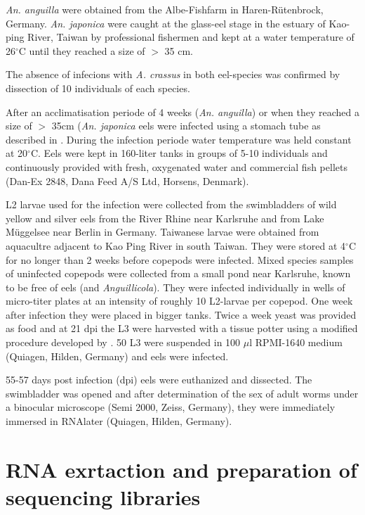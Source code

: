 \textit{An. anguilla} were obtained from the Albe-Fishfarm in
Haren-Rütenbrock, Germany. \textit{An. japonica} were caught at the
glass-eel stage in the estuary of Kao-ping River, Taiwan by
professional fishermen and kept at a water temperature of
26$^{\circ}$C until they reached a size of $>$ 35 cm.

The absence of infecions with \textit{A. crassus} in both eel-species
was confirmed by dissection of 10 individuals of each species.

After an acclimatisation periode of 4 weeks (\textit{An. anguilla}) or
when they reached a size of $>$ 35cm (\textit{An. japonica} eels were
infected using a stomach tube as described in
\cite{boon1990effect}. During the infection periode water temperature
was held constant at 20$^{\circ}$C. Eels were kept in 160-liter tanks
in groups of 5-10 individuals and continuously provided with fresh,
oxygenated water and commercial fish pellets (Dan-Ex 2848, Dana Feed
A/S Ltd, Horsens, Denmark).

L2 larvae used for the infection were collected from the swimbladders
of wild yellow and silver eels from the River Rhine near Karlsruhe and
from Lake M\"uggelsee near Berlin in Germany. Taiwanese larvae were
obtained from aquacultre adjacent to Kao Ping River in south
Taiwan. They were stored at 4$^{\circ}$C for no longer than 2 weeks
before copepods were infected. Mixed species samples of uninfected
copepods were collected from a small pond near Karlsruhe, known to be
free of eels (and \textit{Anguillicola}). They were infected
individually in wells of micro-titer plates at an intensity of roughly
10 L2-larvae per copepod. One week after infection they were placed in
bigger tanks. Twice a week yeast was provided as food and at 21 dpi
the L3 were harvested with a tissue potter using a modified procedure
developed by \cite{haenen_improved_1994}. 50 L3 were suspended in 100
$\mu$l RPMI-1640 medium (Quiagen, Hilden, Germany) and eels were
infected.

55-57 days post infection (dpi) eels were euthanized and dissected.
The swimbladder was opened and after determination of the sex of adult
worms under a binocular microscope (Semi 2000, Zeiss, Germany), they
were immediately immersed in RNAlater (Quiagen, Hilden, Germany).

\section{RNA exrtaction and preparation of sequencing libraries}

